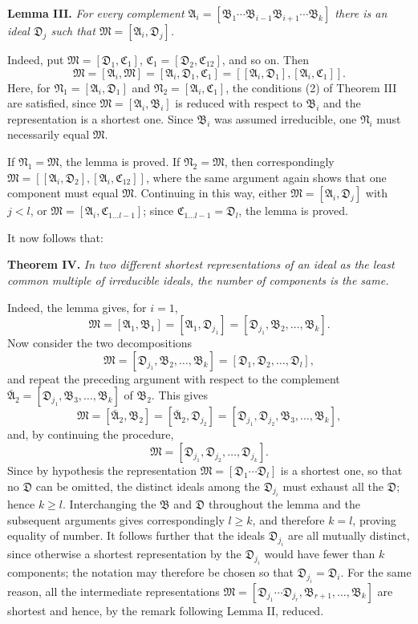 \documentclass[11pt]{article}
\providecommand{\ideal}[1]{\mathfrak{#1}}
\begin{document}
\textbf{Lemma III.} \emph{For every complement $\ideal A_i=[\ideal B_1\cdots\ideal B_{i-1}\ideal B_{i+1}\cdots\ideal B_k]$ there is an ideal $\ideal D_j$ such that $\ideal M=[\ideal A_i,\ideal D_j]$.}

Indeed, put $\ideal M=[\ideal D_1,\ideal C_1]$, $\ideal C_1=[\ideal D_2,\ideal C_{12}]$, and so on. Then
\[
 \ideal M=[\ideal A_i,\ideal M]=[\ideal A_i,\ideal D_1,\ideal C_1]
 =[[\ideal A_i,\ideal D_1],[\ideal A_i,\ideal C_1]].
\]
Here, for $\ideal N_1=[\ideal A_i,\ideal D_1]$ and $\ideal N_2=[\ideal A_i,\ideal C_1]$, the conditions (2) of Theorem III are satisfied, since $\ideal M=[\ideal A_i,\ideal B_i]$ is reduced with respect to $\ideal B_i$ and the representation is a shortest one. Since $\ideal B_i$ was assumed irreducible, one $\ideal N_i$ must necessarily equal $\ideal M$.

If $\ideal N_1=\ideal M$, the lemma is proved. If $\ideal N_2=\ideal M$, then correspondingly
$\ideal M=[[\ideal A_i,\ideal D_2],[\ideal A_i,\ideal C_{12}]]$, where the same argument again shows that one component must equal $\ideal M$. Continuing in this way, either $\ideal M=[\ideal A_i,\ideal D_j]$ with $j<l$, or $\ideal M=[\ideal A_i,\ideal C_{1\ldots l-1}]$; since $\ideal C_{1\ldots l-1}=\ideal D_l$, the lemma is proved.

It now follows that:

\textbf{Theorem IV.} \emph{In two different shortest representations of an ideal as the least common multiple of irreducible ideals, the number of components is the same.}

Indeed, the lemma gives, for $i=1$,
\[
 \ideal M=[\ideal A_1,\ideal B_1]=[\ideal A_1,\ideal D_{j_1}]
 = [\ideal D_{j_1},\ideal B_2,\ldots,\ideal B_k].
\]
Now consider the two decompositions
\[
 \ideal M=[\ideal D_{j_1},\ideal B_2,\ldots,\ideal B_k]
          =[\ideal D_1,\ideal D_2,\ldots,\ideal D_l],
\]
and repeat the preceding argument with respect to the complement $\bar{\ideal A}_2=[\ideal D_{j_1},\ideal B_3,\ldots,\ideal B_k]$ of $\ideal B_2$. This gives
\[
 \ideal M=[\bar{\ideal A}_2,\ideal B_2]=[\bar{\ideal A}_2,\ideal D_{j_2}]
          =[\ideal D_{j_1},\ideal D_{j_2},\ideal B_3,\ldots,\ideal B_k],
\]
and, by continuing the procedure,
\[
 \ideal M=[\ideal D_{j_1},\ideal D_{j_2},\ldots,\ideal D_{j_k}].
\]
Since by hypothesis the representation $\ideal M=[\ideal D_1\cdots\ideal D_l]$ is a shortest one, so that no $\ideal D$ can be omitted, the distinct ideals among the $\ideal D_{j_i}$ must exhaust all the $\ideal D$; hence $k\ge l$. Interchanging the $\ideal B$ and $\ideal D$ throughout the lemma and the subsequent arguments gives correspondingly $l\ge k$, and therefore $k=l$, proving equality of number. It follows further that the ideals $\ideal D_{j_i}$ are all mutually distinct, since otherwise a shortest representation by the $\ideal D_{j_i}$ would have fewer than $k$ components; the notation may therefore be chosen so that $\ideal D_{j_i}=\ideal D_i$. For the same reason, all the intermediate representations $\ideal M=[\ideal D_{j_1}\cdots\ideal D_{j_r},\ideal B_{r+1},\ldots,\ideal B_k]$ are shortest and hence, by the remark following Lemma II, reduced.
\end{document}
